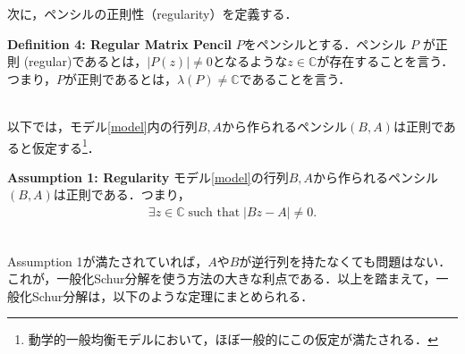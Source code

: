 \documentclass[a4j, dvipdfmx]{jarticle}
\begin{document}
次に，ペンシルの正則性（regularity）を定義する．\\

\begin{itembox}[l]{{\bf Definition 4: Regular Matrix Pencil}}
$P$をペンシルとする．ペンシル $P$ が正則 (regular)であるとは，$|P(z)|\not=0$となるような$z\in\mathbb{C}$が存在することを言う．つまり，$P$が正則であるとは，$\lambda(P)\not=\mathbb{C}$であることを言う．
\end{itembox}
\\

以下では，モデル\eqref{model}内の行列$B,A$から作られるペンシル$(B,A)$は正則であると仮定する\footnote{動学的一般均衡モデルにおいて，ほぼ一般的にこの仮定が満たされる．}．\\

\begin{itembox}[l]{{\bf Assumption 1: Regularity}}
モデル\eqref{model}の行列$B,A$から作られるペンシル$(B,A)$は正則である．つまり，
\begin{align*}
\exists z \in \mathbb{C} \; \text{such that} \; |Bz - A| \not= 0.
\end{align*}
\end{itembox}
\\

Assumption 1が満たされていれば，$A$や$B$が逆行列を持たなくても問題はない．これが，一般化Schur分解を使う方法の大きな利点である．以上を踏まえて，一般化Schur分解は，以下のような定理にまとめられる．\\
\end{document}
